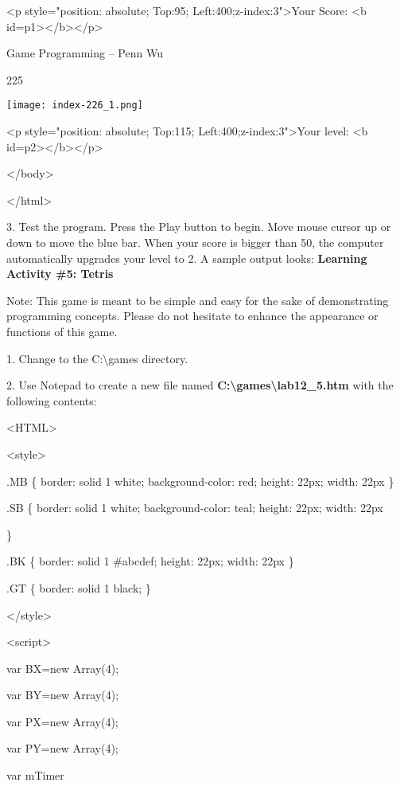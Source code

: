 \documentclass[
]{article}
\begin{document}
\textless p style="position: absolute; Top:95;
Left:400;z-index:3"\textgreater Your Score: \textless b
id=p1\textgreater\textless/b\textgreater\textless/p\textgreater{}

Game Programming -- Penn Wu

225

\protect\hypertarget{index_split_011.htmlux5cux23p226}{}{}\texttt{[image: index-226\_1.png]}

\textless p style="position: absolute; Top:115;
Left:400;z-index:3"\textgreater Your level: \textless b
id=p2\textgreater\textless/b\textgreater\textless/p\textgreater{}

\textless/body\textgreater{}

\textless/html\textgreater{}

3. Test the program. Press the Play button to begin. Move mouse cursor
up or down to move the blue bar. When your score is bigger than 50, the
computer automatically upgrades your level to 2. A sample output looks:
\textbf{Learning Activity \#5: Tetris}

Note: This game is meant to be simple and easy for the sake of
demonstrating programming concepts. Please do not hesitate to enhance
the appearance or functions of this game.

1. Change to the C:\textbackslash games directory.

2. Use Notepad to create a new file named
\textbf{C:\textbackslash games\textbackslash lab12\_5.htm} with the
following contents:

\textless HTML\textgreater{}

\textless style\textgreater{}

.MB \{ border: solid 1 white; background-color: red; height: 22px;
width: 22px \}

.SB \{ border: solid 1 white; background-color: teal; height: 22px;
width: 22px

\}

.BK \{ border: solid 1 \#abcdef; height: 22px; width: 22px \}

.GT \{ border: solid 1 black; \}

\textless/style\textgreater{}

\textless script\textgreater{}

var BX=new Array(4);

var BY=new Array(4);

var PX=new Array(4);

var PY=new Array(4);

var mTimer
\end{document}
